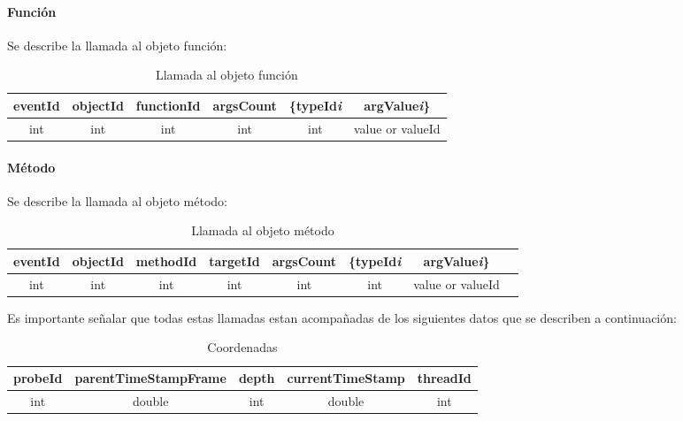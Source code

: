 \documentclass[12pt,legalpaper]{report}
\begin{document}
				\paragraph{Función}
Se describe la llamada al objeto función:\\

\begin{table}[!h]
\begin{center}
\begin{tabular}{| c | c | c | c | c | c |}
\hline
\rowcolor[gray]{0.9}eventId & objectId & functionId & argsCount & \{typeId\textit{{\scriptsize  i}} & argValue\textit{{\scriptsize  i}}\}\\
\hline
int & int & int & int & int & value or valueId\footnotemark[1]\\
\hline
\end{tabular}
\caption{Llamada al objeto función} 
\end{center}
\end{table}

				\paragraph{Método}

Se describe la llamada al objeto método:\\

\begin{table}[!h]
\begin{center}
\begin{tabular}{| c | c | c | c | c | c | c | c |}
\hline
\rowcolor[gray]{0.9}eventId & objectId & methodId & targetId & argsCount & \{typeId\textit{{\scriptsize  i}} & argValue\textit{{\scriptsize  i}}\}\\
\hline
int & int & int & int & int & int & value or valueId\footnotemark[1]\\
\hline
\end{tabular}
\caption{Llamada al objeto método} 
\end{center}
\end{table}


Es importante señalar que todas estas llamadas estan acompañadas de los siguientes datos que se describen a continuación:\\

\begin{table}[!h]
\begin{center}
\begin{tabular}{| c | c | c | c | c |}
\hline
\rowcolor[gray]{0.9}probeId & parentTimeStampFrame & depth & currentTimeStamp & threadId\\
\hline
int & double & int & double & int \\
\hline
\end{tabular}
\caption{Coordenadas} 
\label{Coordenadas}
\end{center}
\end{table}
\end{document}
